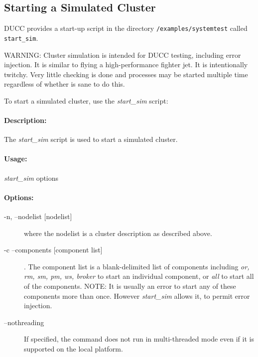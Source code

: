       \subsection{Starting a Simulated Cluster}
      DUCC provides a start-up script in the directory {\tt \duccruntime/examples/systemtest} 
      called {\tt start\_sim}.  

      WARNING: Cluster simulation is intended for DUCC testing, including error injection.  It is
      similar to flying a high-performance fighter jet.  It is intentionally twitchy.  Very little
      checking is done and processes may be started multiple time regardless of whether is sane to
      do this.

      To start a simulated cluster, use the {\em start\_sim} script:

      \paragraph{Description:}
      The {\em start\_sim} script is used to start a simulated cluster.
      
      \paragraph{Usage:}
      {\em start\_sim} options

      \paragraph{Options:}
      \begin{description}
        \item[-n, --nodelist {[nodelist]}] where the nodelist is a cluster description as
          described above.
        \item[-c --components {[component list]}].  The component list is a blank-delimited
          list of components including {\em or, rm, sm, pm, ws, broker} to start an
          individual component, or {\em all} to start all of the components.  NOTE: It is
          usually an error to start any of these components more than once.  However 
          {\em start\_sim} allows it, to permit error injection.
        \item[--nothreading] If specified, the command does not run in multi-threaded mode
          even if it is supported on the local platform.

      \end{description}
      
